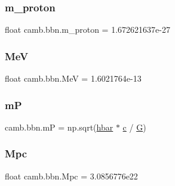 \mbox{\label{namespacecamb_1_1bbn_a91eae46cae8d4e10d04c05b5f8324278}} 
\subsubsection{\texorpdfstring{m\+\_\+proton}{m\_proton}}
{\footnotesize\ttfamily float camb.\+bbn.\+m\+\_\+proton = 1.\+672621637e-\/27}

\mbox{\label{namespacecamb_1_1bbn_ab7d9516327d53209dc68ed04b575b942}} 
\subsubsection{\texorpdfstring{MeV}{MeV}}
{\footnotesize\ttfamily float camb.\+bbn.\+MeV = 1.\+6021764e-\/13}

\mbox{\label{namespacecamb_1_1bbn_a96c42bdaca47fcfad93e6567839f017b}} 
\subsubsection{\texorpdfstring{mP}{mP}}
{\footnotesize\ttfamily camb.\+bbn.\+mP = np.\+sqrt(\mbox{\hyperlink{namespacecamb_1_1bbn_a5b708814b666163b312ae9d46c458a40}{hbar}} $\ast$ \mbox{\hyperlink{namespacecamb_1_1bbn_a679cc6941c03606fb81846de0595bbf0}{c}} / \mbox{\hyperlink{namespacecamb_1_1bbn_a516a8888d6d387c64db5a92882e60839}{G}})}

\mbox{\label{namespacecamb_1_1bbn_ad4577440de870759161fbb421dcfe786}} 
\subsubsection{\texorpdfstring{Mpc}{Mpc}}
{\footnotesize\ttfamily float camb.\+bbn.\+Mpc = 3.\+0856776e22}

\mbox{\label{namespacecamb_1_1bbn_a6c667fa779cc99916a01199319f7757f}} 
